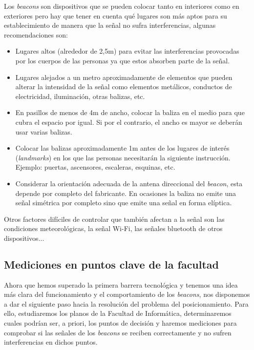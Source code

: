 Los \textit{beacons} son dispositivos que se pueden colocar tanto en interiores como en exteriores pero hay que tener en cuenta qué lugares son más aptos para su establecimiento de manera que la señal no sufra interferencias, algunas recomendaciones son:
\begin{itemize}
	\item Lugares altos (alrededor de 2,5m) para evitar las interferencias provocadas por los cuerpos de las personas ya que estos absorben parte de la señal.
	\item Lugares alejados a un metro aproximadamente de elementos que pueden alterar la intensidad de la señal como elementos metálicos, conductos de electricidad, iluminación, otras balizas, etc.
	\item En pasillos de menos de 4m de ancho, colocar la baliza en el medio para que cubra el espacio por igual. Si por el contrario, el ancho es mayor se deberán usar varias balizas.
	\item Colocar las balizas aproximadamente 1m antes de los lugares de interés (\textit{landmarks}) en los que las personas necesitarán la siguiente instrucción. Ejemplo: puertas, ascensores, escaleras, esquinas, etc.
	\item Considerar la orientación adecuada de la antena direccional del \textit{beacon}, esta depende por completo del fabricante. En ocasiones la baliza no emite una señal simétrica por completo sino que emite una señal en forma elíptica.
\end{itemize}

Otros factores difíciles de controlar que también afectan a la señal son las condiciones meteorológicas, la señal Wi-Fi, las señales bluetooth de otros dispositivos...


\subsection{Mediciones en puntos clave de la facultad}
\label{sec:medicionesbeacons}

Ahora que hemos superado la primera barrera tecnológica y tenemos una idea más clara del funcionamiento y el comportamiento de los \textit{beacons}, nos disponemos a dar el siguiente paso hacia la resolución del problema del posicionamiento. Para ello, estudiaremos los planos de la Facultad de Informática, determinaremos cuales podrían ser, a priori, los puntos de decisión y haremos mediciones para comprobar si las señales de los \textit{beacons} se reciben correctamente y no sufren interferencias en dichos puntos.

